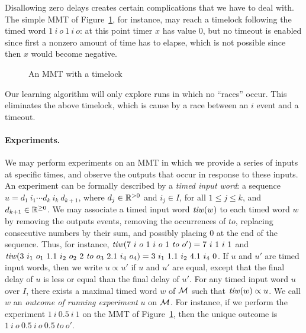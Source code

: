Disallowing zero delays creates certain complications that we have to deal with. The simple MMT of Figure~\ref{fig:timelock}, for instance,
may reach a timelock following the timed word $1 ~ i ~ o ~ 1 ~ i ~ o$: at this point timer $x$ has value $0$, but no timeout is enabled since first a nonzero amount of time has to elapse, which is not possible since then $x$ would become negative.
\begin{figure}[ht]
\begin{center}
\caption{An MMT with a timelock}
\label{fig:timelock}
\end{center}
\end{figure}
Our learning algorithm will only explore runs in which no ``races'' occur. This eliminates the above timelock,
which is cause by a race between an $i$ event and a timeout.

\paragraph{Experiments.}
We may perform experiments on an MMT in which we
provide a series of inputs at specific times, and observe the outputs that occur in response to these inputs.
An experiment can be formally described by a \emph{timed input word}: a sequence
$u = d_1 ~ i_1 \cdots d_k ~ i_k ~ d_{k+1}$, where $d_j \in {\mathbb R}^{> 0}$ and $i_j \in I$, for all $1 \leq j \leq k$,
and $d_{k+1} \in {\mathbb R}^{\geq 0}$.
%
We may associate a timed input word $\mathit{tiw}(w)$ to each timed word $w$ by 
removing the outputs events, 
removing the occurrences of $\mathit{to}$, 
replacing consecutive numbers by their sum, 
and possibly placing $0$ at the end of the sequence.
Thus, for instance,
$\mathit{tiw} (7 ~ i ~ o ~ 1 ~ i ~ o ~ 1 ~ \mathit{to} ~ o') = 7 ~ i ~ 1 ~ i ~ 1$ and
$\mathit{tiw} (3 ~ i_1 ~ o_1 ~ 1.1 ~ i_2 ~ o_2 ~ 2 ~ \mathit{to} ~ o_3 ~ 2.1 ~ i_4 ~ o_4) = 3 ~ i_1 ~ 1.1 ~ i_2 ~ 4.1 ~ i_4 ~ 0$.
%
If $u$ and $u'$ are timed input words, then we write $u \propto u'$ if $u$ and $u'$ are equal, except that the final delay of $u$ is less or equal than the final delay of $u'$.
For any timed input word $u$ over $I$,  there exists a maximal timed word $w$ of ${\mathcal M}$ such that $\mathit{tiw}(w) \propto u$.
We call $w$ an \emph{outcome of running experiment} $u$ on ${\mathcal M}$.
For instance, if we perform the experiment $1 ~ i ~ 0.5 ~ i ~ 1$ on the MMT of Figure~\ref{fig:timelock},
then the unique outcome is $1 ~ i ~ o ~ 0.5 ~ i ~ o ~ 0.5 ~ \mathit{to} ~ o'$.

